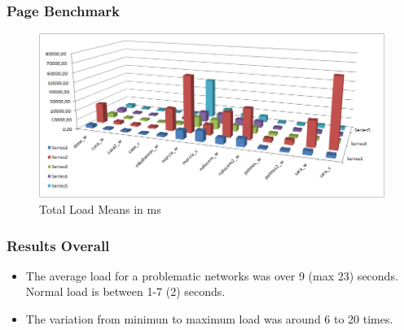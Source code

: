 \begin{frame}
	\frametitle{Page Benchmark}
	\begin{figure}[h!]
		\centering
		\includegraphics[scale=.45]{img/measures_page}
		\caption{Total Load Means in ms}
	\end{figure}
\end{frame}
\begin{frame}
	\frametitle{Results Overall}
	\begin{block}{}
		\begin{itemize}
			\item The average load for a problematic networks was over 9 (max 23) seconds. Normal load is between 1-7 (2) seconds. 
			\item The variation from minimun to maximum load was around 6 to 20 times.
		\end{itemize}
	\end{block}
\end{frame}

